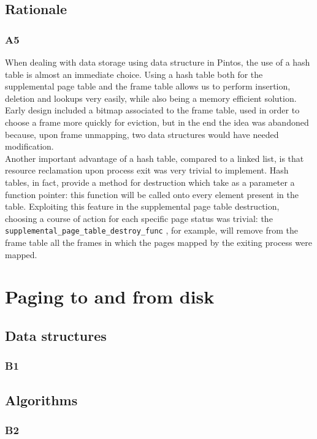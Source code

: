 \documentclass[a4wide, 11pt]{article}
\newcommand{\tx}{\texttt}
\begin{document}
\subsection{Rationale}
\subsubsection{A5}
When dealing with data storage using data structure in Pintos, the use of a hash table is almost an immediate choice. Using a hash table both for the supplemental page table and the frame table allows us to perform insertion, deletion and lookups very easily, while also being a memory efficient solution. Early design included a bitmap associated to the frame table, used in order to choose a frame more quickly for eviction, but in the end the idea was abandoned because, upon frame unmapping, two data structures would have needed modification. \\
Another important advantage of a hash table, compared to a linked  list, is that resource reclamation upon process exit was very trivial to implement. Hash tables, in fact, provide a method for destruction which take as a parameter a function pointer: this function will be called onto every  element present in the table. Exploiting this feature in the supplemental page table destruction, choosing a course of action for each specific page status was trivial: the \tx{supplemental\_page\_table\_destroy\_func} , for example, will remove from the frame table all the frames in which the pages mapped by the exiting process were mapped.

\section{Paging to and from disk}

\subsection{Data structures}
\subsubsection{B1}

\subsection{Algorithms}
\subsubsection{B2}
\end{document}

